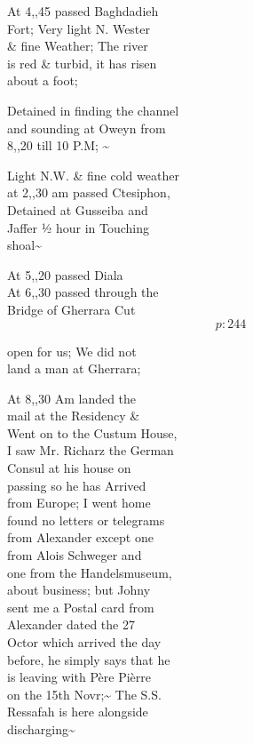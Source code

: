 \documentclass{report}
\begin{document}
	\par{
 	At 4,,45 passed Baghdadieh\ \\Fort; Very light N. Wester\ \\\& fine Weather; The river\ \\is red \& turbid, it has risen\ \\about a foot;\ \\
	}

	\par{
 	Detained in finding the channel\ \\and sounding at Oweyn from\ \\8,,20 till 10 P.M; \~{}\ \\
	}

	\par{
 	Light N.W. \& fine cold weather\ \\at 2,,30 am passed Ctesiphon,\ \\Detained at Gusseiba and\ \\Jaffer ½ hour in Touching\ \\shoal\~{}\ \\
	}

	\par{
 	At 5,,20 passed Diala\ \\At 6,,30 passed through the\ \\Bridge of Gherrara Cut\ \\
  \[p: 244 \]

	}



	\par{
 	open for us; We did not\ \\land a man at Gherrara;\ \\
	}

	\par{
 	At 8,,30 Am landed the\ \\mail at the Residency \&\ \\Went on to the Custum House,\ \\I saw Mr. Richarz the German\ \\Consul at his house on\ \\passing so he has Arrived\ \\from Europe; I went home\ \\found no letters or telegrams\ \\from Alexander except one\ \\from Alois Schweger and\ \\one from the Handelsmuseum,\ \\about business; but Johny\ \\sent me a Postal card from\ \\Alexander dated the 27\ \\Octor which arrived the day\ \\before, he simply says that he\ \\is leaving with Père Pièrre\ \\on the 15th Novr;\~{} The S.S.\ \\Ressafah is here alongside\ \\discharging\~{}\ \\
	}
\end{document}
